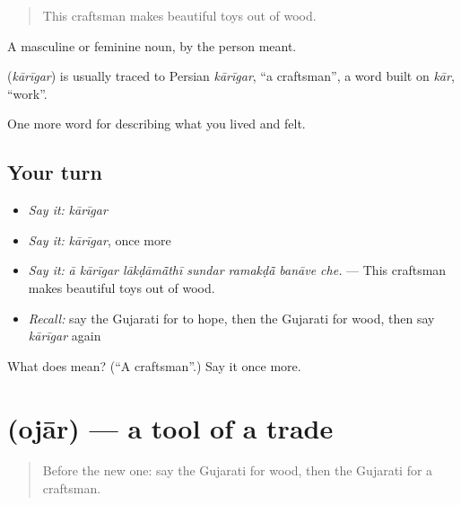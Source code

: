 \begin{quote}
This craftsman makes beautiful toys out of wood.
\end{quote}

A masculine or feminine noun, by the person meant.

\begin{cousinweb}
\textbf{} (\emph{kārīgar}) is usually traced to Persian \emph{kārīgar}, \textquotedblleft{}a craftsman\textquotedblright{}, a word built on \emph{kār}, \textquotedblleft{}work\textquotedblright{}.
\end{cousinweb}

\begin{grammarlens}[title={What you've built}]
One more word for describing what you lived and felt.
\end{grammarlens}

\subsection*{Your turn}
\begin{itemize}
\raggedright
  \item \emph{Say it:} \emph{kārīgar}
  \item \emph{Say it:} \emph{kārīgar}, once more
  \item \emph{Say it:} \emph{ā kārīgar lākḍāmā̃thī sundar ramakḍā̃ banāve che.} — This craftsman makes beautiful toys out of wood.
  \item \emph{Recall:} say the Gujarati for to hope, then the Gujarati for wood, then say \emph{kārīgar} again
\end{itemize}

\begin{tcolorbox}[breakable,colback=teal!4,colframe=teal!35!black,title={Before you move on}]
What does  mean? (\textquotedblleft{}A craftsman\textquotedblright{}.) Say it once more.
\end{tcolorbox}
\section[\texorpdfstring{\gu{ઓજાર} (ojār)}{ઓજાર (ojār)}]{ (ojār) — a tool of a trade}

\label{lesson:GU-C501-ojar}



\begin{quote}
Before the new one: say the Gujarati for wood, then the Gujarati for a craftsman.
\end{quote}

